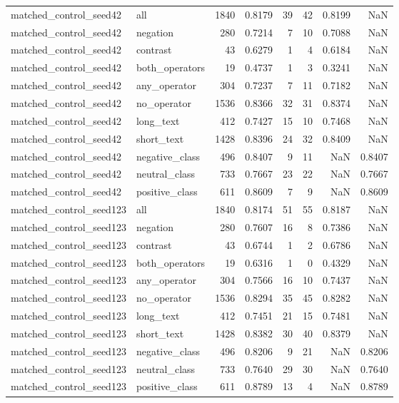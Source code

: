 \begin{tabular}{llrrrrrr}
matched\_control\_seed42 & all & 1840 & 0.8179 & 39 & 42 & 0.8199 & NaN \\
matched\_control\_seed42 & negation & 280 & 0.7214 & 7 & 10 & 0.7088 & NaN \\
matched\_control\_seed42 & contrast & 43 & 0.6279 & 1 & 4 & 0.6184 & NaN \\
matched\_control\_seed42 & both\_operators & 19 & 0.4737 & 1 & 3 & 0.3241 & NaN \\
matched\_control\_seed42 & any\_operator & 304 & 0.7237 & 7 & 11 & 0.7182 & NaN \\
matched\_control\_seed42 & no\_operator & 1536 & 0.8366 & 32 & 31 & 0.8374 & NaN \\
matched\_control\_seed42 & long\_text & 412 & 0.7427 & 15 & 10 & 0.7468 & NaN \\
matched\_control\_seed42 & short\_text & 1428 & 0.8396 & 24 & 32 & 0.8409 & NaN \\
matched\_control\_seed42 & negative\_class & 496 & 0.8407 & 9 & 11 & NaN & 0.8407 \\
matched\_control\_seed42 & neutral\_class & 733 & 0.7667 & 23 & 22 & NaN & 0.7667 \\
matched\_control\_seed42 & positive\_class & 611 & 0.8609 & 7 & 9 & NaN & 0.8609 \\
matched\_control\_seed123 & all & 1840 & 0.8174 & 51 & 55 & 0.8187 & NaN \\
matched\_control\_seed123 & negation & 280 & 0.7607 & 16 & 8 & 0.7386 & NaN \\
matched\_control\_seed123 & contrast & 43 & 0.6744 & 1 & 2 & 0.6786 & NaN \\
matched\_control\_seed123 & both\_operators & 19 & 0.6316 & 1 & 0 & 0.4329 & NaN \\
matched\_control\_seed123 & any\_operator & 304 & 0.7566 & 16 & 10 & 0.7437 & NaN \\
matched\_control\_seed123 & no\_operator & 1536 & 0.8294 & 35 & 45 & 0.8282 & NaN \\
matched\_control\_seed123 & long\_text & 412 & 0.7451 & 21 & 15 & 0.7481 & NaN \\
matched\_control\_seed123 & short\_text & 1428 & 0.8382 & 30 & 40 & 0.8379 & NaN \\
matched\_control\_seed123 & negative\_class & 496 & 0.8206 & 9 & 21 & NaN & 0.8206 \\
matched\_control\_seed123 & neutral\_class & 733 & 0.7640 & 29 & 30 & NaN & 0.7640 \\
matched\_control\_seed123 & positive\_class & 611 & 0.8789 & 13 & 4 & NaN & 0.8789 \\

\end{tabular}
